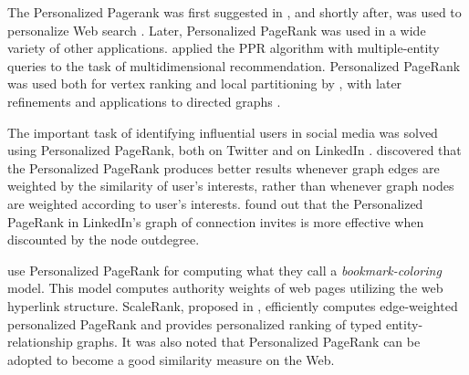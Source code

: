 \documentclass[11pt,oneside]{book}
\begin{document}
The Personalized Pagerank was first suggested in
\citep{brin1998can}, and shortly after, was used to
personalize Web search
\citep{haveliwala2002topic,haveliwala2003topic,haveliwala2003analytical}. Later, Personalized PageRank was used in a wide variety of other applications. \cite{lee2011random} applied the PPR algorithm with multiple-entity queries to the task of multidimensional recommendation. Personalized PageRank was used both for vertex ranking and local partitioning by \cite{andersen2006local}, with later refinements \citep{andersen2007detecting} and applications to directed graphs \citep{andersen2007local}. 

The important task of identifying influential users in social media was solved using Personalized PageRank, both on Twitter \citep{weng2010twitterrank} and on LinkedIn \citep{budalakoti2012}. \cite{weng2010twitterrank} discovered that the Personalized PageRank produces better results whenever graph edges are weighted by the similarity of user’s interests, rather than whenever graph nodes are weighted according to user's interests. \cite{budalakoti2012} found out that the Personalized PageRank in LinkedIn's graph of connection invites is more effective when discounted by the node outdegree.

\cite{berkhin2006bookmark} use Personalized PageRank for computing what they call a \textit{bookmark-coloring} model. This model computes authority weights of web pages utilizing the web hyperlink structure. ScaleRank, proposed in \citep{hristidis2014efficient}, efficiently computes edge-weighted personalized PageRank and provides personalized ranking of typed entity-relationship graphs. It was also noted \citep{sarkar2008fast} that Personalized PageRank can be adopted to become a good similarity measure on the Web.

\end{document}
